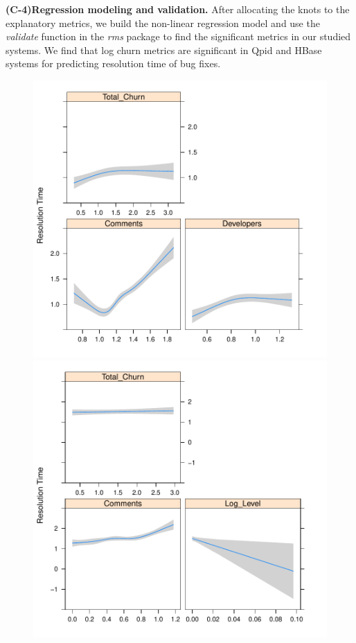 \textbf{(C-4)Regression modeling and validation.} After allocating the knots to the explanatory metrics, we build the non-linear regression model and use the \textsl{validate} function in the \textsl{rms} package to find the significant metrics in our studied systems. We find that log churn metrics are significant in Qpid and HBase systems for predicting resolution time of bug fixes. 

\begin{figure}[t]
	\begin{minipage}{.5\columnwidth}
		\centering
		
		\includegraphics[width=.95\textwidth]{HadoopDirectionPlot}	
	\end{minipage}
		\begin{minipage}{.5\columnwidth}
			\centering
			
			\includegraphics[width=.95\textwidth]{QpidDirectionPlot}	
		\end{minipage}
			

\end{figure}
